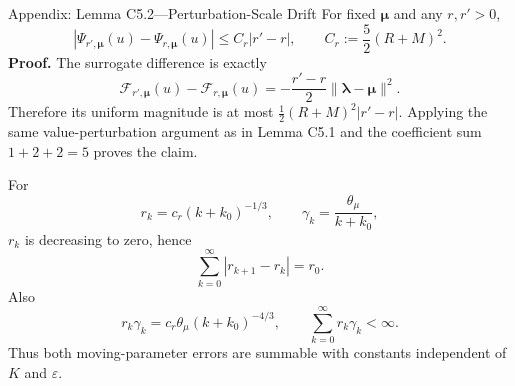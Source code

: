 \documentclass[handout,compress,9pt]{beamer}
\newcommand{\bmu}{\bm{\mu}}
\newcommand{\blmbd}{\bm{\lambda}}
\newcommand{\eps}{\varepsilon}
\begin{document}
\begin{frame}{Appendix: Lemma C5.2---Perturbation-Scale Drift
\hfill\hyperlink{appendix:contents}{}}
\scriptsize
For fixed $\bmu$ and any $r,r'>0$,
\begin{equation*}
  |\Psi_{r',\bmu}(u)-\Psi_{r,\bmu}(u)|
  \le C_r|r'-r|,
  \qquad C_r:=\frac52(R+M)^2.
\end{equation*}
\noindent\textbf{Proof.}
The surrogate difference is exactly
\begin{equation*}
  \mathcal F_{r',\bmu}(u)-\mathcal F_{r,\bmu}(u)
  =-\frac{r'-r}{2}\|\blmbd-\bmu\|^2.
\end{equation*}
Therefore its uniform magnitude is at most
$\frac12(R+M)^2|r'-r|$.  Applying the same value-perturbation argument as in
Lemma C5.1 and the coefficient sum $1+2+2=5$ proves the claim.

For
\begin{equation*}
  r_k=c_r(k+k_0)^{-1/3},
  \qquad
  \gamma_k=\frac{\theta_\mu}{k+k_0},
\end{equation*}
$r_k$ is decreasing to zero, hence
\begin{equation*}
  \sum_{k=0}^{\infty}|r_{k+1}-r_k|=r_0.
\end{equation*}
Also
\begin{equation*}
  r_k\gamma_k=c_r\theta_\mu(k+k_0)^{-4/3},
  \qquad
  \sum_{k=0}^{\infty}r_k\gamma_k<\infty.
\end{equation*}
Thus both moving-parameter errors are summable with constants independent of
$K$ and $\eps$.
\end{frame}
\end{document}
